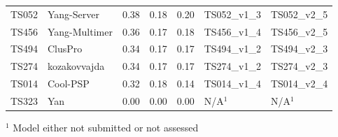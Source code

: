 \begin{table}[ht]
{\begin{tabular}{llrrrll}
TS052 & Yang-Server & 0.38 & 0.18 & 0.20 & TS052\_v1\_3 & TS052\_v2\_5 \\ 
TS456 & Yang-Multimer & 0.36 & 0.17 & 0.18 & TS456\_v1\_4 & TS456\_v2\_5 \\ 
TS494 & ClusPro & 0.34 & 0.17 & 0.17 & TS494\_v1\_2 & TS494\_v2\_3 \\ 
TS274 & kozakovvajda & 0.34 & 0.17 & 0.17 & TS274\_v1\_2 & TS274\_v2\_3 \\ 
TS014 & Cool-PSP & 0.32 & 0.18 & 0.14 & TS014\_v1\_4 & TS014\_v2\_4 \\ 
TS323 & Yan & 0.00 & 0.00 & 0.00 & N/A$^{1}$ & N/A$^{1}$ \\ 
\bottomrule
\end{tabular}%
}
\begin{flushleft}\footnotesize $^{1}$ Model either not submitted or not assessed\end{flushleft}
\end{table}
